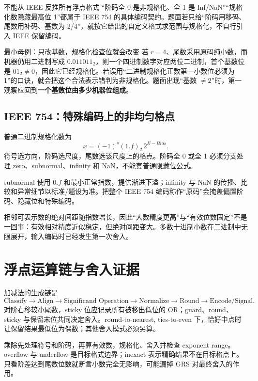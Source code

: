 \documentclass[UTF8,fontset=fandol,11pt,a4paper]{ctexart}
\begin{document}
\begin{warnbox}{不能从 IEEE 反推所有浮点格式}
“阶码全 0 是非规格化、全 1 是 Inf/NaN”“规格化数隐藏最高位 1”都属于 IEEE 754 的具体编码契约。题面若只给“阶码用移码、尾数用补码、基数为 2/4”，就按它给出的自定义格式求范围与规格化，不自行引入 IEEE 保留编码。
\end{warnbox}

\begin{methodbox}{最小母例：只改基数，规格化检查位就会改变}
若 $r=4$、尾数采用原码纯小数，而机器仍用二进制写成 $0.011011_2$，则一个四进制数字对应两位二进制，首个基数位是 $01_2\ne0$，因此它已经规格化。若误用“二进制规格化正数第一小数位必须为 1”的口诀，就会把这个合法表示错判为非规格化。题面出现“基数 $\ne2$”时，第一观察应回到\textbf{一个基数位由多少机器位组成}。
\end{methodbox}

\subsection{IEEE 754：特殊编码上的非均匀格点}
普通二进制规格化数为
\[
x=(-1)^s(1.f)_2\,2^{E-Bias}.
\]
符号选方向，阶码选尺度，尾数选该尺度上的格点。阶码全 0 或全 1 必须分支处理 zero、subnormal、infinity 和 NaN，不能套普通隐藏位公式。

subnormal 使用 $0.f$ 和最小正常指数，提供渐进下溢；infinity 与 NaN 的传播、比较和异常细节以标准/题设为准。把整个 IEEE 754 编码称作“原码”会掩盖偏置阶码、隐藏位和特殊编码。

相邻可表示数的绝对间距随指数增长，因此“大数精度更高”与“有效位数固定”不是一回事：有效相对精度近似稳定，但绝对间距变大。多数十进制小数在二进制中无限展开，输入编码时已经发生第一次舍入。

\begin{center}

\end{center}

\section{浮点运算链与舍入证据}
加减法的生成链是
\[
\text{Classify}\to\text{Align}\to\text{Significand Operation}\to\text{Normalize}\to\text{Round}\to\text{Encode/Signal}.
\]
对阶右移较小尾数，sticky 位应记录所有被移出低位的 OR；guard、round、sticky 与保留末位共同决定舍入。round-to-nearest, ties-to-even 下，恰好中点时让保留结果最低位为偶数；其他舍入模式必须另算。

乘除先处理符号和阶码，再算有效数，规格化、舍入并检查 exponent range。overflow 与 underflow 是目标格式边界；inexact 表示精确结果不在目标格点上。只看阶差达到尾数位数就断言小数完全无影响，可能漏掉 GRS 对最终舍入的作用。
\end{document}
